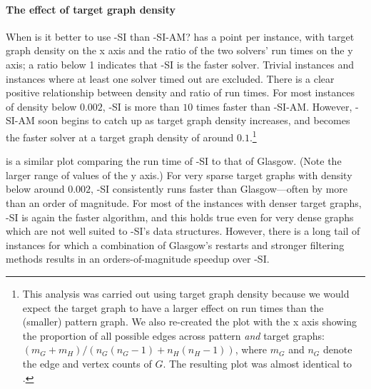 \paragraph*{The effect of target graph density}
When is it better to use \McSplit-SI than \McSplit-SI-AM?
 has a point per instance, with target graph density on the x axis and the ratio of the two solvers' run times 
on the y axis; a ratio below 1 indicates that \McSplit-SI is the faster solver.  Trivial instances and instances where at least one
solver timed out are excluded.  There is a clear positive relationship between density and ratio of run times.  For most instances of
density below $0.002$, \McSplit-SI is more than $10$ times faster than \McSplit-SI-AM.  However,
\McSplit-SI-AM soon begins to catch up as target graph density increases, and becomes the faster solver at a target graph density of around
$0.1$.\footnote{This analysis was carried out using target graph density because we would expect the target graph to have
a larger effect on run times than the (smaller) pattern graph.  We also re-created the plot with the x axis showing the proportion
of all possible edges across pattern \emph{and} target graphs: $(m_G + m_H) / (n_G(n_G-1) + n_H(n_H-1))$,
where $m_G$ and $n_G$ denote the edge and vertex counts of $G$.  The resulting
plot was almost identical to .}

 is a similar plot comparing the run time of \McSplit-SI to that of Glasgow.
(Note the larger range of values of the y axis.)  For very sparse target graphs with density below around $0.002$,
\McSplit-SI consistently runs faster than Glasgow---often by more than an order of magnitude.  For most of the
instances with denser target graphs,
\McSplit-SI is again the faster algorithm, and this holds true even for very dense graphs which are not well suited
to \McSplit-SI's data structures.  However, there is a long tail of instances
for which a combination of Glasgow's restarts and stronger filtering methods results in
an orders-of-magnitude speedup over \McSplit-SI.

